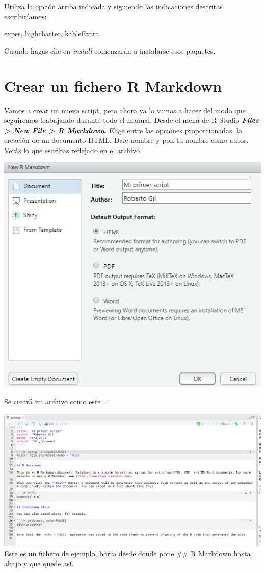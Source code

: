 \documentclass[
]{book}
\begin{document}
Utiliza la opción arriba indicada y siguiendo las indicaciones descritas escribiríamos:

expss, highcharter, kableExtra

Cuando hagas clic en \emph{install} comenzarán a instalarse esos paquetes.

\hypertarget{crear-un-fichero-r-markdown}{%
\section{Crear un fichero R Markdown}\label{crear-un-fichero-r-markdown}}

Vamos a crear un nuevo script, pero ahora ya lo vamos a hacer del modo que seguiremos trabajando durante todo el manual. Desde el menú de R Studio \textbf{\emph{Files \textgreater{} New File \textgreater{} R Markdown}}. Elige entre las opciones proporcionadas, la creación de un documento HTML. Dale nombre y pon tu nombre como autor. Verás lo que escribas reflejado en el archivo.

\includegraphics{data/RS07.png}

Se creará un archivo como este \ldots{}

\includegraphics{data/RS08.png}
Este es un fichero de ejemplo, borra desde donde pone \#\# R Markdown hasta abajo y que quede así.
\end{document}
